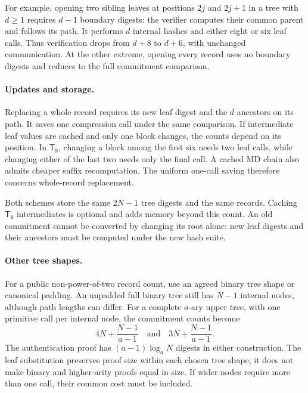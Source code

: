 \documentclass[11pt,letterpaper]{article}
\theoremstyle{definition} %
\newcommand{\Tate}{\mathsf{T}_{8}}
\begin{document}
For example, opening two sibling leaves at positions $2j$ and $2j+1$ in a
tree with $d\geq1$ requires
$d-1$ boundary digests: the verifier computes their common parent and follows
its path. It performs $d$ internal hashes and either eight or six leaf calls.
Thus verification drops from $d+8$ to $d+6$, with unchanged communication.
At the other extreme, opening every record uses no boundary digests and
reduces to the full commitment comparison.

\paragraph{Updates and storage.}
Replacing a whole record requires its new leaf digest and the $d$ ancestors
on its path. It saves one compression call under the same comparison.
If intermediate leaf values are cached and only one block changes, the
counts depend on its position. In $\Tate$, changing a block among the first
six needs two leaf calls, while changing either of the last two needs only
the final call. A cached MD chain also admits cheaper suffix recomputation.
The uniform one-call saving therefore concerns whole-record replacement.

Both schemes store the same $2N-1$ tree digests and the same records.
Caching $\Tate$ intermediates is optional and adds memory beyond this count.
An old commitment cannot be converted by changing its root alone: new leaf
digests and their ancestors must be computed under the new hash suite.

\paragraph{Other tree shapes.}
For a public non-power-of-two record count, use an agreed binary tree shape
or canonical padding. An unpadded full binary tree still has $N-1$ internal
nodes, although path lengths can differ. For a complete $a$-ary upper tree,
with one primitive call per internal node, the commitment counts become
\[
 4N+\frac{N-1}{a-1}
 \quad\text{and}\quad
 3N+\frac{N-1}{a-1}.
\]
The authentication proof has $(a-1)\log_aN$ digests in either construction.
The leaf substitution preserves proof size within each chosen tree shape;
it does not make binary and higher-arity proofs equal in size. If wider
nodes require more than one call, their common cost must be included.
\end{document}
